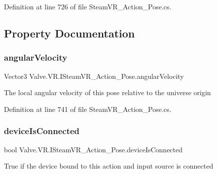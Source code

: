 Definition at line 726 of file Steam\+V\+R\+\_\+\+Action\+\_\+\+Pose.\+cs.



\subsection{Property Documentation}
\mbox{\label{interface_valve_1_1_v_r_1_1_i_steam_v_r___action___pose_a7f31eba29e24c48263a1106a7cae1510}} 
\subsubsection{\texorpdfstring{angularVelocity}{angularVelocity}}
{\footnotesize\ttfamily Vector3 Valve.\+V\+R.\+I\+Steam\+V\+R\+\_\+\+Action\+\_\+\+Pose.\+angular\+Velocity\hspace{0.3cm}{\ttfamily [get]}}



The local angular velocity of this pose relative to the universe origin 



Definition at line 741 of file Steam\+V\+R\+\_\+\+Action\+\_\+\+Pose.\+cs.

\mbox{\label{interface_valve_1_1_v_r_1_1_i_steam_v_r___action___pose_acc2b4cbb97eb5fc582f82eaf48134daf}} 
\subsubsection{\texorpdfstring{deviceIsConnected}{deviceIsConnected}}
{\footnotesize\ttfamily bool Valve.\+V\+R.\+I\+Steam\+V\+R\+\_\+\+Action\+\_\+\+Pose.\+device\+Is\+Connected\hspace{0.3cm}{\ttfamily [get]}}



True if the device bound to this action and input source is connected 



